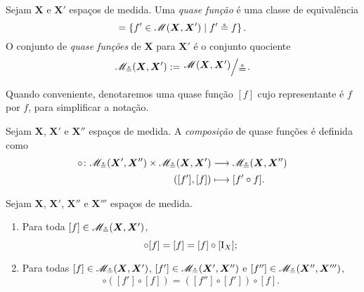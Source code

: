 \begin{definition}
Sejam $\bm X$ e $\bm X'$ espaços de medida. Uma \emph{quase função} é uma classe de equivalência
	\begin{equation*}
	[f] = \set{f' \in \Men(\bm X, \bm X')}{f' \qeq f}.
	\end{equation*}
O conjunto de \emph{quase funções} de $\bm X$ para $\bm X'$ é o conjunto quociente
	\begin{equation*}
	\Menq(\bm X, \bm X') := \quo{\Men(\bm X, \bm X')}{\qeq}.
	\end{equation*}
\end{definition}

Quando conveniente, denotaremos uma quase função $[f]$ cujo representante é $f$ por $f$, para simplificar a notação.

\begin{definition}
Sejam $\bm X$, $\bm X'$ e $\bm X''$ espaços de medida. A \emph{composição} de quase funções é definida como
	\begin{align*}
	{\circ}\colon {\mathscr{M}_{\circeq}(\bm X', \bm X'') \times \mathscr{M}_{\circeq}(\bm X, \bm X')} &\longrightarrow {\mathscr{M}_{\circeq}(\bm X, \bm X'')} \\{([f'],[f])} &\longmapsto [f' \circ f].
	\end{align*}
\end{definition}

\begin{proposition}
Sejam $\bm X$, $\bm X'$, $\bm X''$ e $\bm X'''$ espaços de medida.
	\begin{enumerate}
	\item Para toda $[f] \in \mathscr{M}_{\circeq}(\bm X, \bm X')$,
		\begin{equation*}
		[\Id_{X'}] \circ [f] = [f] = [f] \circ [\Id_X];
		\end{equation*}
	\item Para todas $[f] \in \mathscr{M}_{\circeq}(\bm X, \bm X')$, $[f'] \in \mathscr{M}_{\circeq}(\bm X', \bm X'')$ e $[f''] \in \mathscr{M}_{\circeq}(\bm X'', \bm X''')$,
		\begin{equation*}
		[f''] \circ ([f'] \circ [f]) = ([f''] \circ [f']) \circ [f].
		\end{equation*}
	\end{enumerate}
\end{proposition}



























